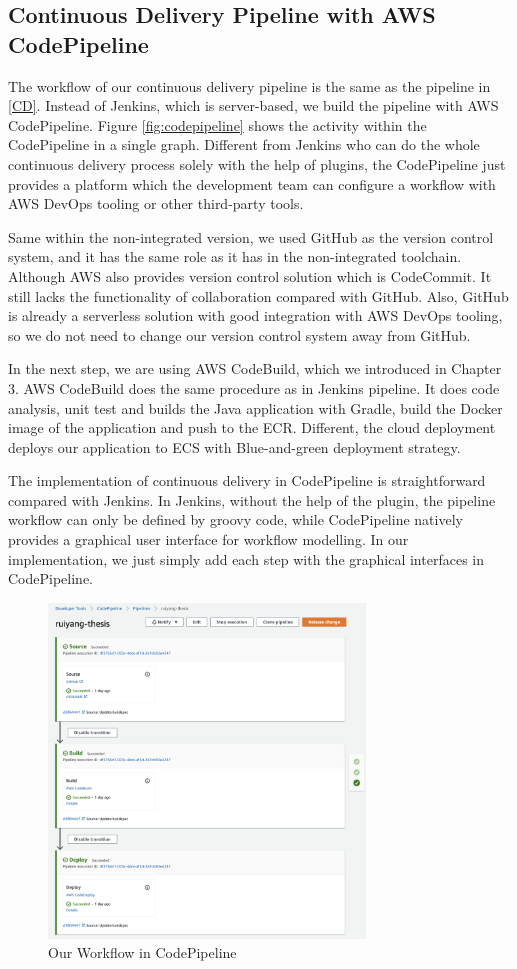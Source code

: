 \subsection{Continuous Delivery Pipeline with AWS CodePipeline}
The workflow of our continuous delivery pipeline is the same as the pipeline in \ref{CD}. Instead of Jenkins, which is server-based, we build the pipeline with AWS CodePipeline. Figure \ref{fig:codepipeline} shows the activity within the CodePipeline in a single graph. Different from Jenkins who can do the whole continuous delivery process solely with the help of plugins, the CodePipeline just provides a platform which the development team can configure a workflow with AWS DevOps tooling or other third-party tools. 
\par
Same within the non-integrated version, we used GitHub as the version control system, and it has the same role as it has in the non-integrated toolchain. Although AWS also provides version control solution which is CodeCommit. It still lacks the functionality of collaboration compared with GitHub. Also, GitHub is already a serverless solution with good integration with AWS DevOps tooling, so we do not need to change our version control system away from GitHub. 
\par
In the next step, we are using AWS CodeBuild, which we introduced in Chapter 3. AWS CodeBuild does the same procedure as in Jenkins pipeline. It does code analysis, unit test and builds the Java application with Gradle, build the Docker image of the application and push to the ECR. Different, the cloud deployment deploys our application to ECS with Blue-and-green deployment strategy.
\par
The implementation of continuous delivery in CodePipeline is straightforward compared with Jenkins. In Jenkins, without the help of the plugin, the pipeline workflow can only be defined by groovy code, while CodePipeline natively provides a graphical user interface for workflow modelling. In our implementation, we just simply add each step with the graphical interfaces in CodePipeline.
\begin{figure}[h]
 \centering
 \includegraphics[width=0.75\textwidth]{pics/cp-interface.png}
 \caption{Our Workflow in CodePipeline}
 \label{fig:cp-edit}
\end{figure}
